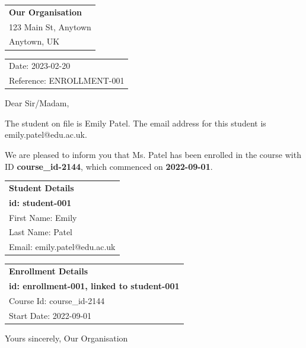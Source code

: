 \documentclass{article}
\begin{document}
\begin{tabular}{@{}l@{}}
\textbf{Our Organisation} \\
123 Main St, Anytown \\
Anytown, UK \\
\end{tabular}\par
\vspace{-1em}
\begin{tabular}{@{}l@{}}
Date: 2023-02-20 \\
Reference: ENROLLMENT-001 \\
\end{tabular}

Dear Sir/Madam,

The student on file is Emily Patel. The email address for this student is emily.patel@edu.ac.uk.

We are pleased to inform you that Ms. Patel has been enrolled in the course with ID \textbf{course\_id-2144}, which commenced on \textbf{2022-09-01}.

\begin{tabular}{@{}l@{}}
\textbf{Student Details} \\
\textbf{id: student-001} \\
First Name: Emily \\
Last Name: Patel \\
Email: emily.patel@edu.ac.uk \\
\end{tabular}

\begin{tabular}{@{}l@{}}
\textbf{Enrollment Details} \\
\textbf{id: enrollment-001, linked to student-001} \\
Course Id: course\_id-2144 \\
Start Date: 2022-09-01 \\
\end{tabular}

Yours sincerely,
Our Organisation
\end{document}
